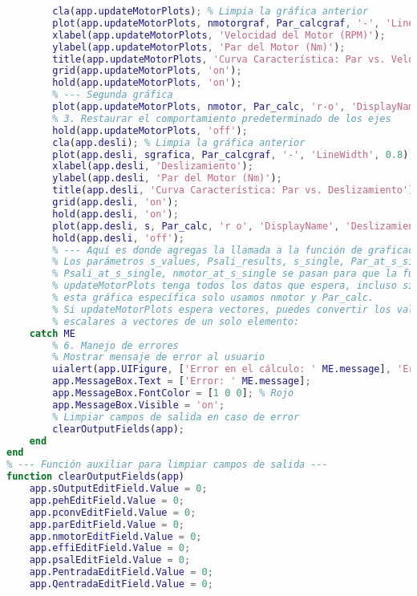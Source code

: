 \begin{lstlisting}[language=Matlab, caption={MATLAB Code}, basicstyle=\footnotesize\ttfamily]
        % --- CÓDIGO DE GRAFICACIÓN DIRECTO ---
        cla(app.updateMotorPlots); % Limpia la gráfica anterior
        plot(app.updateMotorPlots, nmotorgraf, Par_calcgraf, '-', 'LineWidth', 0.8);
        xlabel(app.updateMotorPlots, 'Velocidad del Motor (RPM)');
        ylabel(app.updateMotorPlots, 'Par del Motor (Nm)');
        title(app.updateMotorPlots, 'Curva Característica: Par vs. Velocidad');
        grid(app.updateMotorPlots, 'on');
        hold(app.updateMotorPlots, 'on');
        % --- Segunda gráfica
        plot(app.updateMotorPlots, nmotor, Par_calc, 'r-o', 'DisplayName', 'Potencia de Salida', 'LineWidth', 1.5); % Línea roja con guiones y 'x'
        % 3. Restaurar el comportamiento predeterminado de los ejes
        hold(app.updateMotorPlots, 'off');
        cla(app.desli); % Limpia la gráfica anterior
        plot(app.desli, sgrafica, Par_calcgraf, '-', 'LineWidth', 0.8);
        xlabel(app.desli, 'Deslizamiento');
        ylabel(app.desli, 'Par del Motor (Nm)');
        title(app.desli, 'Curva Característica: Par vs. Deslizamiento');
        grid(app.desli, 'on');
        hold(app.desli, 'on');
        plot(app.desli, s, Par_calc, 'r o', 'DisplayName', 'Deslizamiento', 'LineWidth', 1.5); % Línea roja con guiones y 'x'
        hold(app.desli, 'off');
        % --- Aquí es donde agregas la llamada a la función de graficación ---
        % Los parámetros s_values, Psali_results, s_single, Par_at_s_single,
        % Psali_at_s_single, nmotor_at_s_single se pasan para que la función
        % updateMotorPlots tenga todos los datos que espera, incluso si para
        % esta gráfica específica solo usamos nmotor y Par_calc.
        % Si updateMotorPlots espera vectores, puedes convertir los valores
        % escalares a vectores de un solo elemento:
    catch ME
        % 6. Manejo de errores
        % Mostrar mensaje de error al usuario
        uialert(app.UIFigure, ['Error en el cálculo: ' ME.message], 'Error', 'Icon', 'error');
        app.MessageBox.Text = ['Error: ' ME.message];
        app.MessageBox.FontColor = [1 0 0]; % Rojo
        app.MessageBox.Visible = 'on';
        % Limpiar campos de salida en caso de error
        clearOutputFields(app);
    end
end
% --- Función auxiliar para limpiar campos de salida ---
function clearOutputFields(app)
    app.sOutputEditField.Value = 0;
    app.pehEditField.Value = 0;
    app.pconvEditField.Value = 0;
    app.parEditField.Value = 0;
    app.nmotorEditField.Value = 0;
    app.effiEditField.Value = 0;
    app.psalEditField.Value = 0;
    app.PentradaEditField.Value = 0;
    app.QentradaEditField.Value = 0;

\end{lstlisting}
